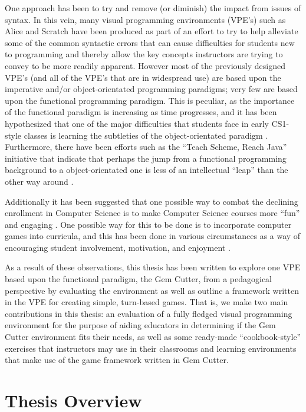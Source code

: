One approach has been to try and remove (or diminish) the impact from issues of syntax.  In this vein, many visual programming environments (VPE's) such as Alice\cite{alice} and Scratch\cite{scratch} have been produced as part of an effort to try to help alleviate some of the common syntactic errors that can cause difficulties for students new to programming and thereby allow the key concepts instructors are trying to convey to be more readily apparent.  However most of the previously designed VPE's (and all of the VPE's that are in widespread use) are based upon the imperative and/or object-orientated programming paradigms; very few are based upon the functional programming paradigm.  This is peculiar, as the importance of the functional paradigm is increasing as time progresses, and it has been hypothesized that one of the major difficulties that students face in early CS1-style classes is learning the subtleties of the object-orientated paradigm \cite{Manaris07,Mahmoud04,Benander04}. Furthermore, there have been efforts such as the ``Teach Scheme, Reach Java'' initiative \cite{Bloch08,teachScheme,Felleisen04} that indicate that perhaps the jump from a functional programming background to a object-orientated one is less of an intellectual ``leap'' than the other way around \cite{Huch05}.

Additionally it has been suggested that one possible way to combat the declining enrollment in Computer Science is to make Computer Science courses more ``fun'' and engaging \cite{Carter06}.  One possible way for this to be done is to incorporate computer games into  curricula, and this has been done in various circumstances as a way of encouraging student involvement, motivation, and enjoyment \cite{Barnes08,Gooch08,Curtis05,Overmars05,Sweedyk05}.

As a result of these observations, this thesis has been written to explore one VPE based upon the functional paradigm, the Gem Cutter, from a pedagogical perspective by evaluating the environment as well as outline a framework written in the VPE for creating simple, turn-based games.  That is, we make two main contributions in this thesis: an evaluation of a fully fledged visual programming environment for the purpose of aiding educators in determining if the Gem Cutter environment fits their needs, as well as some ready-made ``cookbook-style'' exercises that instructors may use in their classrooms and learning environments that make use of the game framework written in Gem Cutter.

\section{Thesis Overview}

